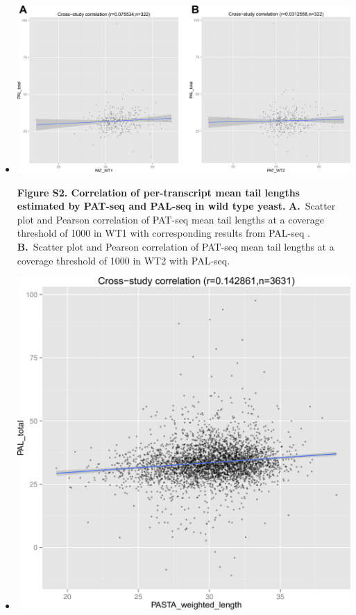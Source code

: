 \documentclass[10pt]{article}
\begin{document}
\begin{itemize}
\item[]{
\begin{center}
\includegraphics[scale=0.9]{FigureS2.png}
\end{center}

\textbf{Figure S2. Correlation of per-transcript mean tail lengths estimated by PAT-seq and PAL-seq in wild type yeast.} \textbf{A.}~Scatter plot and Pearson correlation of PAT-seq mean tail lengths at a coverage threshold of 1000 in WT1 with corresponding results from PAL-seq \cite{subtelny14}. \textbf{B.}~Scatter plot and Pearson correlation of PAT-seq mean tail lengths at a coverage threshold of 1000 in WT2 with PAL-seq.}
\newpage

\item[]{
\begin{center}
\includegraphics[scale=1.25]{FigureS3.png}
\end{center}

}
\end{itemize}
\end{document}
